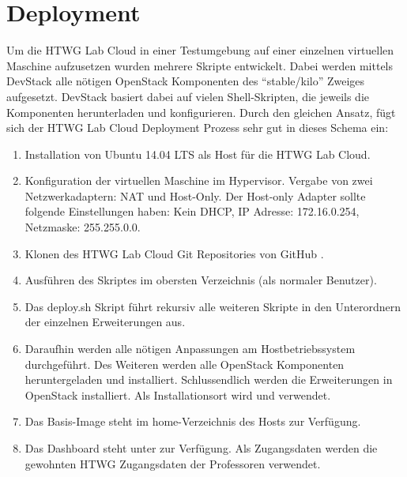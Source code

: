 \chapter{Deployment}

Um die HTWG Lab Cloud in einer Testumgebung auf einer einzelnen virtuellen Maschine aufzusetzen wurden mehrere  Skripte entwickelt.
Dabei werden mittels DevStack \cite{devstack} alle nötigen OpenStack Komponenten des \enquote{stable/kilo} Zweiges aufgesetzt.
DevStack basiert dabei auf vielen Shell-Skripten, die jeweils die Komponenten herunterladen und konfigurieren.
Durch den gleichen Ansatz, fügt sich der HTWG Lab Cloud Deployment Prozess sehr gut in dieses Schema ein:

\begin{enumerate}
\item Installation von Ubuntu 14.04 LTS als Host für die HTWG Lab Cloud.
\item Konfiguration der virtuellen Maschine im Hypervisor. Vergabe von zwei Netzwerkadaptern: NAT und Host-Only. Der Host-only Adapter sollte folgende Einstellungen haben: Kein DHCP, IP Adresse: 172.16.0.254, Netzmaske: 255.255.0.0.
\item Klonen des HTWG Lab Cloud Git Repositories von GitHub \cite{git-source}.
\item Ausführen des  Skriptes im obersten Verzeichnis (als normaler Benutzer).
\item Das deploy.sh Skript führt rekursiv alle weiteren Skripte in den Unterordnern der einzelnen Erweiterungen aus.
\item Daraufhin werden alle nötigen Anpassungen am Hostbetriebssystem durchgeführt.  Des Weiteren werden alle OpenStack Komponenten heruntergeladen und installiert. Schlussendlich werden die Erweiterungen in OpenStack installiert. Als Installationsort wird  und  verwendet.
\item Das Basis-Image steht im home-Verzeichnis des Hosts zur Verfügung.
\item Das Dashboard steht unter  zur Verfügung. Als Zugangsdaten werden die gewohnten HTWG Zugangsdaten der Professoren verwendet.
\end{enumerate}
